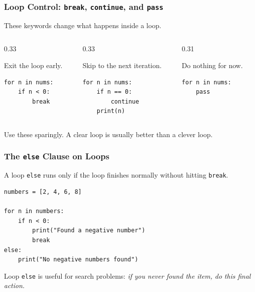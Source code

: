 \documentclass[aspectratio=169,10pt]{beamer}
\begin{document}
\begin{frame}[fragile]
\frametitle{Loop Control: \texttt{break}, \texttt{continue}, and \texttt{pass}}
These keywords change what happens inside a loop.

\begin{columns}[T,totalwidth=\textwidth]
\begin{column}{0.33\textwidth}
\begin{tcolorbox}[lecturebox,title={\texttt{break}}]
Exit the loop early.
\begin{lstlisting}[style=pycodesmall]
for n in nums:
    if n < 0:
        break
\end{lstlisting}
\end{tcolorbox}
\end{column}
\begin{column}{0.33\textwidth}
\begin{tcolorbox}[lecturebox,title={\texttt{continue}}]
Skip to the next iteration.
\begin{lstlisting}[style=pycodesmall]
for n in nums:
    if n == 0:
        continue
    print(n)
\end{lstlisting}
\end{tcolorbox}
\end{column}
\begin{column}{0.31\textwidth}
\begin{tcolorbox}[lecturebox,title={\texttt{pass}}]
Do nothing for now.
\begin{lstlisting}[style=pycodesmall]
for n in nums:
    pass
\end{lstlisting}
\end{tcolorbox}
\end{column}
\end{columns}

\begin{tcolorbox}[lecturebox,title=Beginner advice]
Use these sparingly. A clear loop is usually better than a clever loop.
\end{tcolorbox}
\end{frame}


\begin{frame}[fragile]
\frametitle{The \texttt{else} Clause on Loops}
\begin{tcolorbox}[lecturebox,title=Key idea]
A loop \texttt{else} runs only if the loop finishes normally without hitting \texttt{break}.
\end{tcolorbox}

\begin{lstlisting}[style=pycode]
numbers = [2, 4, 6, 8]

for n in numbers:
    if n < 0:
        print("Found a negative number")
        break
else:
    print("No negative numbers found")
\end{lstlisting}

\begin{tcolorbox}[lecturebox,title=Useful pattern]
Loop \texttt{else} is useful for search problems: \textit{if you never found the item, do this final action.}
\end{tcolorbox}
\end{frame}
\end{document}
